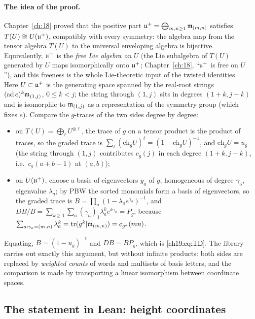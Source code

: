 \paragraph{The idea of the proof.}  Chapter~\ref{ch:18} proved that the positive part $\mathfrak{u}^+=\bigoplus_{m,n\ge1}\mathfrak{m}_{(m,n)}$
satisfies $T(U)\cong U(\mathfrak{u}^+)$, compatibly with every symmetry: the algebra map from the tensor algebra $T(U)$ to the
universal enveloping algebra is bijective.  Equivalently, $\mathfrak{u}^+$ is the \emph{free Lie algebra on $U$} (the Lie subalgebra of
$T(U)$ generated by $U$ maps isomorphically onto $\mathfrak{u}^+$; Chapter~\ref{ch:18}, ``$\mathfrak{u}^+$ is free on $U$''), and this
freeness is the whole Lie-theoretic input of the twisted identities.  Here $U\subset\mathfrak{u}^+$ is the generating space spanned
by the real-root strings $(\mathrm{ad}\,e)^k\mathfrak{m}_{(1,j)}$, $0\le k<j$; the string through $(1,j)$ sits in degrees
$(1+k,j-k)$ and is isomorphic to $\mathfrak{m}_{(1,j)}$ as a representation of the symmetry group (which fixes $e$).  Compare the
$g$-traces of the two sides degree by degree:
\begin{itemize}
\item on $T(U)=\bigoplus_\ell U^{\otimes\ell}$, the trace of $g$ on a tensor product is the product of traces, so the
  graded trace is $\sum_\ell(\mathrm{ch}_gU)^\ell=(1-\mathrm{ch}_gU)^{-1}$, and $\mathrm{ch}_gU=u_g$ (the string through $(1,j)$
  contributes $c_g(j)$ in each degree $(1+k,j-k)$, i.e.\ $c_g(a+b-1)$ at $(a,b)$);
\item on $U(\mathfrak{u}^+)$, choose a basis of eigenvectors $y_a$ of $g$, homogeneous of degree $\gamma_a$, eigenvalue
  $\lambda_a$; by PBW the sorted monomials form a basis of eigenvectors, so the graded trace is
  $B=\prod_a(1-\lambda_ae^{\gamma_a})^{-1}$, and $DB/B=\sum_{k\ge1}\sum_a(\gamma_a)_1\lambda_a^ke^{k\gamma_a}=P_g$, because
  $\sum_{a:\gamma_a=(m,n)}\lambda_a^k=\operatorname{tr}(g^k|\mathfrak{m}_{(m,n)})=c_{g^k}(mn)$.
\end{itemize}
Equating, $B=(1-u_g)^{-1}$ and $DB=BP_g$, which is \eqref{ch19:eq:TD}.  The library carries out exactly this argument,
but without infinite products: both sides are replaced by \emph{weighted counts} of words and multisets of basis
letters, and the comparison is made by transporting a linear isomorphism between coordinate spaces.

\subsection{The statement in Lean: height coordinates}

